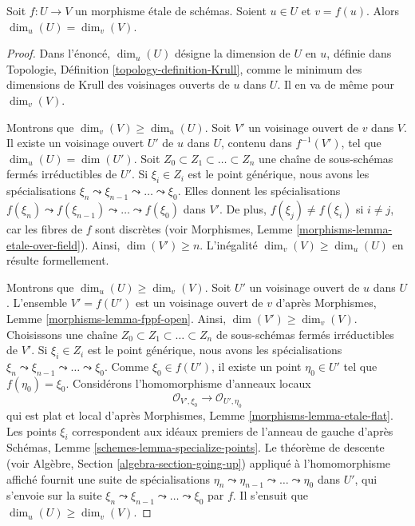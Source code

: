 \begin{lemma}
\label{lemma-dimension-at-point-local}
Soit $f : U \to V$ un morphisme \'etale de schémas. Soient $u \in U$ et
$v = f(u)$. Alors $\dim_u(U) = \dim_v(V)$.
\end{lemma}

\begin{proof}
Dans l'énoncé, $\dim_u(U)$ désigne la dimension de $U$ en $u$, définie dans
Topologie, Définition \ref{topology-definition-Krull}, comme le minimum des
dimensions de Krull des voisinages ouverts de $u$ dans $U$. Il en va de même
pour $\dim_v(V)$.

\medskip\noindent
Montrons que $\dim_v(V) \geq \dim_u(U)$. Soit $V'$ un voisinage ouvert de
$v$ dans $V$. Il existe un voisinage ouvert $U'$ de $u$ dans $U$, contenu
dans $f^{-1}(V')$, tel que $\dim_u(U) = \dim(U')$. Soit
$Z_0 \subset Z_1 \subset \ldots \subset Z_n$ une chaîne de sous-schémas
fermés irréductibles de $U'$. Si $\xi_i \in Z_i$ est le point générique,
nous avons les spécialisations
$\xi_n \leadsto \xi_{n - 1} \leadsto \ldots \leadsto \xi_0$. Elles donnent
les spécialisations
$f(\xi_n) \leadsto f(\xi_{n - 1}) \leadsto \ldots \leadsto f(\xi_0)$ dans
$V'$. De plus, $f(\xi_j) \not = f(\xi_i)$ si $i \not = j$, car les fibres de
$f$ sont discrètes (voir Morphismes, Lemme
\ref{morphisms-lemma-etale-over-field}). Ainsi, $\dim(V') \geq n$.
L'inégalité $\dim_v(V) \geq \dim_u(U)$ en résulte formellement.

\medskip\noindent
Montrons que $\dim_u(U) \geq \dim_v(V)$. Soit $U'$ un voisinage ouvert de
$u$ dans $U$. L'ensemble $V' = f(U')$ est un voisinage ouvert de $v$ d'après
Morphismes, Lemme \ref{morphisms-lemma-fppf-open}. Ainsi,
$\dim(V') \geq \dim_v(V)$. Choisissons une chaîne
$Z_0 \subset Z_1 \subset \ldots \subset Z_n$ de sous-schémas fermés
irréductibles de $V'$. Si $\xi_i \in Z_i$ est le point générique, nous avons
les spécialisations
$\xi_n \leadsto \xi_{n - 1} \leadsto \ldots \leadsto \xi_0$. Comme
$\xi_0 \in f(U')$, il existe un point $\eta_0 \in U'$ tel que
$f(\eta_0) = \xi_0$. Considérons l'homomorphisme d'anneaux locaux
$$
\mathcal{O}_{V', \xi_0} \longrightarrow \mathcal{O}_{U', \eta_0}
$$
qui est plat et local d'après Morphismes, Lemme
\ref{morphisms-lemma-etale-flat}. Les points $\xi_i$ correspondent aux idéaux
premiers de l'anneau de gauche d'après Schémas, Lemme
\ref{schemes-lemma-specialize-points}. Le théorème de descente (voir Algèbre,
Section \ref{algebra-section-going-up}) appliqué à l'homomorphisme affiché
fournit une suite de spécialisations
$\eta_n \leadsto \eta_{n - 1} \leadsto \ldots \leadsto \eta_0$ dans $U'$,
qui s'envoie sur la suite
$\xi_n \leadsto \xi_{n - 1} \leadsto \ldots \leadsto \xi_0$ par $f$.
Il s'ensuit que $\dim_u(U) \geq \dim_v(V)$.
\end{proof}

